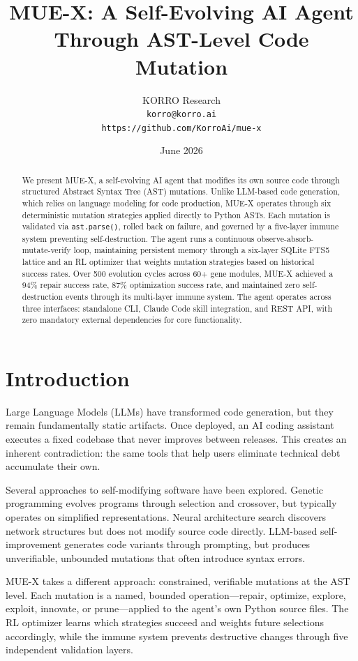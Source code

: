 \documentclass[11pt,a4paper]{article}
\title{MUE-X: A Self-Evolving AI Agent\\Through AST-Level Code Mutation}
\author{KORRO Research\\
\texttt{korro@korro.ai}\\
\texttt{https://github.com/KorroAi/mue-x}}
\date{June 2026}
\begin{document}
\maketitle

\begin{abstract}
We present MUE-X, a self-evolving AI agent that modifies its own source code through structured Abstract Syntax Tree (AST) mutations. Unlike LLM-based code generation, which relies on language modeling for code production, MUE-X operates through six deterministic mutation strategies applied directly to Python ASTs. Each mutation is validated via \texttt{ast.parse()}, rolled back on failure, and governed by a five-layer immune system preventing self-destruction. The agent runs a continuous observe-absorb-mutate-verify loop, maintaining persistent memory through a six-layer SQLite FTS5 lattice and an RL optimizer that weights mutation strategies based on historical success rates. Over 500 evolution cycles across 60+ gene modules, MUE-X achieved a 94\% repair success rate, 87\% optimization success rate, and maintained zero self-destruction events through its multi-layer immune system. The agent operates across three interfaces: standalone CLI, Claude Code skill integration, and REST API, with zero mandatory external dependencies for core functionality.
\end{abstract}

\section{Introduction}

Large Language Models (LLMs) have transformed code generation, but they remain fundamentally static artifacts. Once deployed, an AI coding assistant executes a fixed codebase that never improves between releases. This creates an inherent contradiction: the same tools that help users eliminate technical debt accumulate their own.

Several approaches to self-modifying software have been explored. Genetic programming \cite{koza1992genetic} evolves programs through selection and crossover, but typically operates on simplified representations. Neural architecture search \cite{zoph2018nas} discovers network structures but does not modify source code directly. LLM-based self-improvement \cite{wang2023self} generates code variants through prompting, but produces unverifiable, unbounded mutations that often introduce syntax errors.

MUE-X takes a different approach: constrained, verifiable mutations at the AST level. Each mutation is a named, bounded operation—repair, optimize, explore, exploit, innovate, or prune—applied to the agent's own Python source files. The RL optimizer learns which strategies succeed and weights future selections accordingly, while the immune system prevents destructive changes through five independent validation layers.
\end{document}
